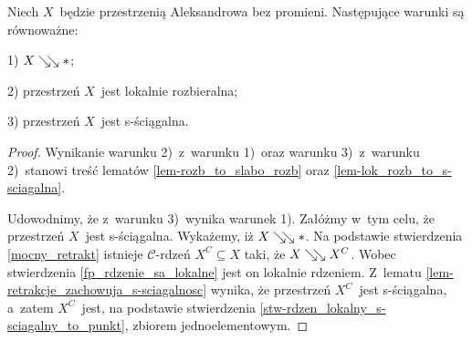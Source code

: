 \begin{wn}\label{wn-rozbieralnosc_wtw_slaba_rozbieralnosc}
Niech $X$~będzie przestrzenią Aleksandrowa bez promieni. Następujące warunki są równoważne:
\begin{compactenum}
\item[1)] $X\searrow\!\!\searrow *$;
\item[2)] przestrzeń $X$~jest lokalnie rozbieralna;
\item[3)] przestrzeń $X$~jest s-ściągalna.
\end{compactenum}
\end{wn}
\begin{proof}
Wynikanie warunku 2)~z~warunku 1)~oraz warunku 3)~z~warunku 2)~stanowi treść lematów \ref{lem-rozb_to_slabo_rozb} oraz \ref{lem-lok_rozb_to_s-sciagalna}.

Udowodnimy, że z~warunku 3)~wynika warunek 1). Załóżmy w~tym celu, że przestrzeń $X$~jest s-ściągalna. Wykażemy, iż $X\searrow\!\!\searrow *$. Na podstawie stwierdzenia \ref{mocny_retrakt} istnieje $\mathcal{C}$-rdzeń $X^C\subseteq X$ taki, że $X\searrow\!\!\searrow X^C$. Wobec stwierdzenia \ref{fp_rdzenie_sa_lokalne} jest on lokalnie rdzeniem. Z~lematu \ref{lem-retrakcje_zachowuja_s-sciagalnosc} wynika, że przestrzeń $X^C$~jest s-ściągalna, a~zatem $X^C$~jest, na podstawie stwierdzenia \ref{stw-rdzen_lokalny_s-sciagalny_to_punkt}, zbiorem jednoelementowym.
\end{proof}

\begin{comment}
\begin{stw}\label{tw-rozbieralnosc_wtw_slaba_rozbieralnosc}
Niech $X$~będzie przestrzenią Aleksandrowa bez promieni. Wówczas $X\dism *$ wtedy i~tylko wtedy, gdy przestrzeń $X$~jest lokalnie rozbieralna.
\end{stw}
\begin{proof}
Ze stwierdzenia \ref{stw-rozb_to_slabo_rozb} wiemy, że jeśli $X\dism *$, to przestrzeń $X$~jest lokalnie rozbieralna.

Załóżmy, że przestrzeń $X$~jest lokalnie rozbieralna. Udowodnimy, że $X\dism *$. Na podstawie stwierdzenia \ref{mocny_retrakt} istnieje $\mathcal{C}$-rdzeń $X^C\subseteq X$ taki, że $X\dism X^C$. Wobec stwierdzenia \ref{fp_rdzenie_sa_lokalne} jest on rdzeniem lokalnie. Z~lematu \ref{lem-retrakcje_zachowuja_slaba_rozbieralnosc} wynika, że przestrzeń $X^C$~jest lokalnie rozbieralna, a~zatem $X^C$~jest, na podstawie lematu \ref{lem-rdzen_lokalny_slabo_rozb_to_punkt}, zbiorem jednoelementowym.
\end{proof}
\end{comment}

